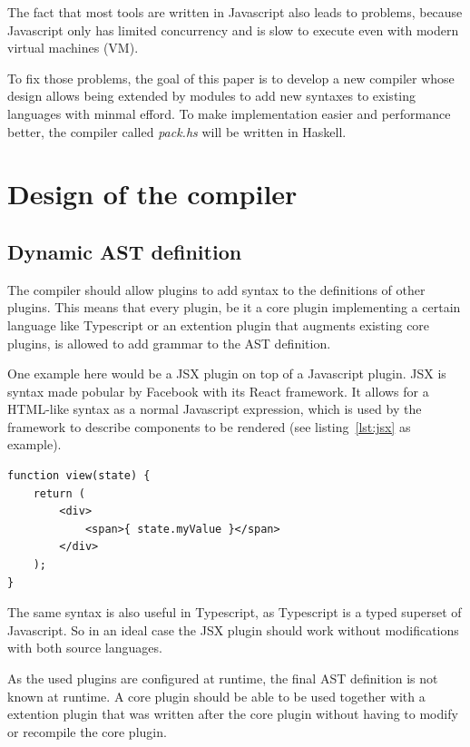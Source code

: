 The fact that most tools are written in Javascript also leads to problems, because Javascript only has limited concurrency and is slow to execute even with modern virtual machines (VM).

To fix those problems, the goal of this paper is to develop a new compiler whose design allows being extended by modules to add new syntaxes to existing languages with minmal efford. To make implementation easier and performance better, the compiler called \textit{pack.hs} will be written in Haskell.

\section{Design of the compiler}

\subsection{Dynamic AST definition}

The compiler should allow plugins to add syntax to the definitions of other plugins. This means that every plugin, be it a core plugin implementing a certain language like Typescript or an extention plugin that augments existing core plugins, is allowed to add grammar to the AST definition.

One example here would be a JSX plugin on top of a Javascript plugin. JSX is syntax made pobular by Facebook with its React framework. It allows for a HTML-like syntax as a normal Javascript expression, which is used by the framework to describe components to be rendered (see listing~\ref{lst:jsx} as example).

\begin{lstlisting}[caption={Simple JSX view function}, captionpos=b, label=lst:jsx]
function view(state) {
    return (
        <div>
            <span>{ state.myValue }</span>
        </div>
    );
}
\end{lstlisting}

The same syntax is also useful in Typescript, as Typescript is a typed superset of Javascript. So in an ideal case the JSX plugin should work without modifications with both source languages.

As the used plugins are configured at runtime, the final AST definition is not known at runtime. A core plugin should be able to be used together with a extention plugin that was written after the core plugin without having to modify or recompile the core plugin.


